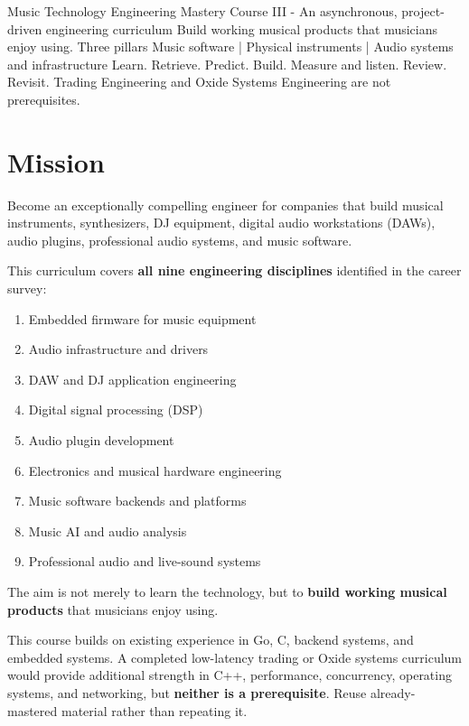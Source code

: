 \documentclass[11pt,letterpaper]{article}
\begin{document}
\coursecover
  {Music Technology Engineering Mastery}
  {Course III - An asynchronous, project-driven engineering curriculum}
  {Build working musical products that musicians enjoy using.}
  {Three pillars}
  {Music software | Physical instruments | Audio systems and infrastructure}
  {Learn. Retrieve. Predict. Build. Measure and listen. Review. Revisit.}
  {Trading Engineering and Oxide Systems Engineering are not prerequisites.}

\tableofcontents
\clearpage

\section{Mission}\label{mission}

Become an exceptionally compelling engineer for companies that build musical instruments, synthesizers, DJ equipment, digital audio workstations (DAWs), audio plugins, professional audio systems, and music software.

This curriculum covers \textbf{all nine engineering disciplines} identified in the career survey:

\begin{enumerate}
\item Embedded firmware for music equipment
\item Audio infrastructure and drivers
\item DAW and DJ application engineering
\item Digital signal processing (DSP)
\item Audio plugin development
\item Electronics and musical hardware engineering
\item Music software backends and platforms
\item Music AI and audio analysis
\item Professional audio and live-sound systems
\end{enumerate}

The aim is not merely to learn the technology, but to \textbf{build working musical products} that musicians enjoy using.

This course builds on existing experience in Go, C, backend systems, and embedded systems. A completed low-latency trading or Oxide systems curriculum would provide additional strength in C++, performance, concurrency, operating systems, and networking, but \textbf{neither is a prerequisite}. Reuse already-mastered material rather than repeating it.
\end{document}
